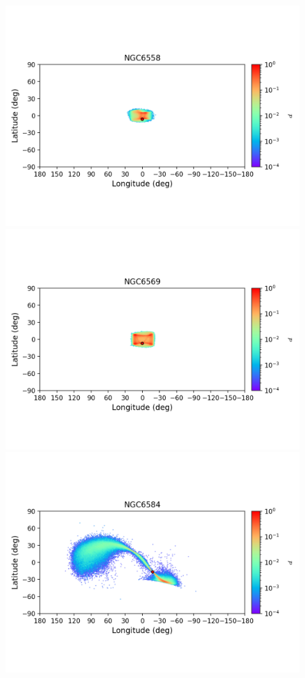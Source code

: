 \begin{figure}
        \includegraphics[clip=true, trim = 0mm 20mm 0mm 10mm, width=1\columnwidth]{images/error_plots_NGC6558.png}
        \includegraphics[clip=true, trim = 0mm 20mm 0mm 10mm, width=1\columnwidth]{images/error_plots_NGC6569.png}
        \includegraphics[clip=true, trim = 0mm 20mm 0mm 10mm, width=1\columnwidth]{images/error_plots_NGC6584.png}

\end{figure}
